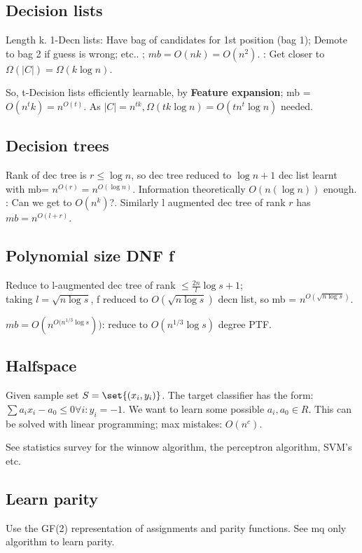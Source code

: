 \documentclass[oneside, article]{memoir}
\begin{document}
\subsection{Decision lists}
Length k. 1-Decn lists: Have bag of candidates for 1st position (bag 1); Demote to bag 2 if guess is wrong; etc.. ; $mb = O(nk) = O(n^{2})$. \oprob: Get closer to $\Omega(|C|) = \Omega(k\log n)$.

So, t-Decision lists efficiently learnable, by \textbf{Feature expansion}; mb = $O(n^{t}k) = n^{O(t)}$. As $|C| = n^{tk}, \Omega(tk \log n) = O(tn^{t}\log n)$ needed.

\subsection{Decision trees}
Rank of dec tree is $r \leq \log n$, so dec tree reduced to $\log n + 1$ dec list learnt with mb= $n^{O(r)} = n^{O( \log n)}$. Information theoretically $O(n (\log n))$ enough. \why \oprob: Can we get to $O(n^{k})$?. Similarly l augmented dec tree of rank $r$ has $mb = n^{O(l+r)}$.

\subsection{Polynomial size DNF f}
Reduce to l-augmented dec tree of rank $\leq \frac{2n}{l}\log s + 1$;\\
taking $l=\sqrt{n\log s}$, f reduced to $O(\sqrt{n\log s})$ decn list, so mb = $n^{O(\sqrt{n\log s})}$.

$mb = O(n^{O(n^{1/3}\log s}))$: reduce to $O(n^{1/3}\log s)$ degree PTF.

\subsection{Halfspace}
Given sample set $S = \set{(x_{i}, y_i)}$. The target classifier has the form: $\sum a_{i}x_{i} - a_0 \leq 0 \forall i: y_i = -1$. We want to learn some possible $a_{i}, a_0 \in R$. This can be solved with linear programming; max mistakes: $O(n^{c})$.

See statistics survey for the winnow algorithm, the perceptron algorithm, SVM's etc.

\subsection{Learn parity}
Use the GF(2) representation of assignments and parity functions. See mq only algorithm to learn parity.
\end{document}
